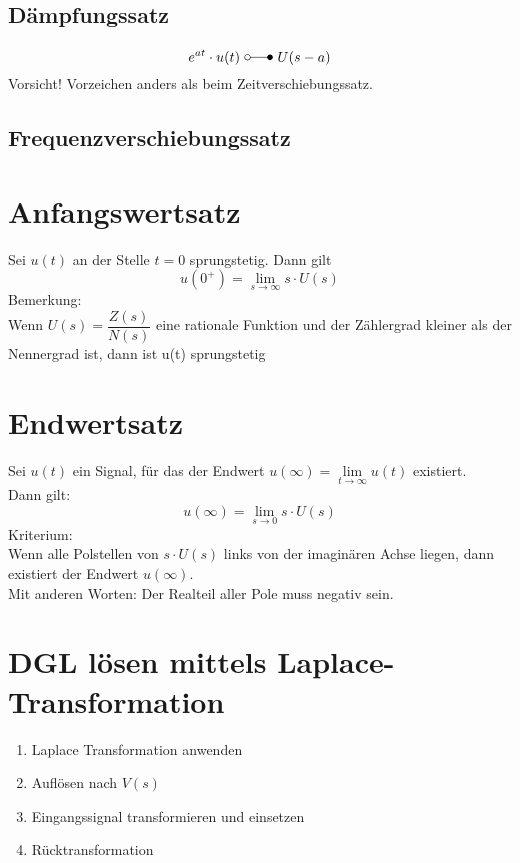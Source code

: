 \subsection{Dämpfungssatz}
\[ 
    e^{at} \cdot u(t) ~ \laplace ~ U(s - a) 
\]
Vorsicht! Vorzeichen anders als beim Zeitverschiebungssatz.

\subsection{Frequenzverschiebungssatz}



\section{Anfangswertsatz}
Sei $u(t)$ an der Stelle $t = 0$ sprungstetig. Dann gilt
\[ 
    u(0^+) = \lim\limits_{s \to \infty} s \cdot U(s) 
\]
Bemerkung: \\
Wenn $U(s) = \dfrac{Z(s)}{N(s)}$ eine rationale Funktion  und der Zählergrad 
kleiner als der Nennergrad ist, dann ist u(t) sprungstetig

\section{Endwertsatz}
Sei $u(t)$ ein Signal, für das der Endwert
$u(\infty) = \lim\limits_{t \to \infty} u(t)$ existiert. \\
Dann gilt:
\[ 
u(\infty) = \lim\limits_{s \to 0} s \cdot U(s) 
\]
Kriterium: \\
Wenn alle Polstellen von $s \cdot U(s)$ links von der imaginären Achse liegen,
dann existiert der Endwert $u(\infty)$. \\
Mit anderen Worten: Der Realteil aller Pole muss negativ sein.

\section{DGL lösen mittels Laplace-Transformation}
\begin{enumerate}
    \item Laplace Transformation anwenden
    \item Auflösen nach $V(s)$
    \item Eingangssignal transformieren und einsetzen
    \item Rücktransformation
\end{enumerate}

